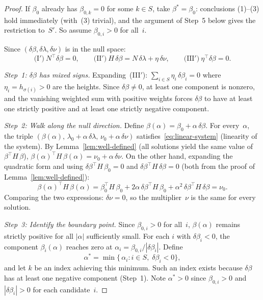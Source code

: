 \begin{proof}
If $\beta_0$ already has $\beta_{0,k} = 0$ for some $k \in S$,
take $\beta^* = \beta_0$: conclusions (1)--(3) hold immediately
(with~(3) trivial), and the argument of Step~5 below gives the
restriction to~$S'$. So assume $\beta_{0,i} > 0$ for all~$i$.

Since $(\delta\beta, \delta\lambda, \delta\nu)$ is in the null space:
\[
  \text{(I$'$)}\ N^\top \delta\beta = 0, \qquad
  \text{(II$'$)}\ H\,\delta\beta
    = N\,\delta\lambda + \eta\,\delta\nu, \qquad
  \text{(III$'$)}\ \eta^\top \delta\beta = 0.
\]

\emph{Step~1: $\delta\beta$ has mixed signs.}
Expanding~(III$'$):
$\sum_{i \in S} \eta_i\, \delta\beta_i = 0$
where $\eta_i = h_{\sigma(i)} > 0$ are the heights.
Since $\delta\beta \neq 0$, at least one component is
nonzero, and the vanishing weighted sum with positive weights
forces $\delta\beta$ to have at least one strictly positive
and at least one strictly negative component.

\emph{Step~2: Walk along the null direction.}
Define $\beta(\alpha) = \beta_0 + \alpha\,\delta\beta$.
For every~$\alpha$, the triple
$(\beta(\alpha),\, \lambda_0 + \alpha\,\delta\lambda,\,
  \nu_0 + \alpha\,\delta\nu)$
satisfies~\eqref{eq:linear-system} (linearity of the system).
By Lemma~\ref{lem:well-defined}
(all solutions yield the same value of
$\beta^\top H\, \beta$),
$\beta(\alpha)^\top H\, \beta(\alpha) = \nu_0 + \alpha\,\delta\nu$.
On the other hand, expanding the quadratic form and using
$\delta\beta^\top H\, \beta_0 = 0$ and
$\delta\beta^\top H\, \delta\beta = 0$
(both from the proof of Lemma~\ref{lem:well-defined}):
\[
  \beta(\alpha)^\top H\, \beta(\alpha)
  = \beta_0^\top H\, \beta_0
    + 2\alpha\,\delta\beta^\top H\,\beta_0
    + \alpha^2\,\delta\beta^\top H\,\delta\beta
  = \nu_0.
\]
Comparing the two expressions: $\delta\nu = 0$, so the
multiplier~$\nu$ is the same for every solution.

\emph{Step~3: Identify the boundary point.}
Since $\beta_{0,i} > 0$ for all~$i$,
$\beta(\alpha)$ remains strictly positive for all
$|\alpha|$ sufficiently small.
For each $i$ with $\delta\beta_i < 0$, the component
$\beta_i(\alpha)$ reaches zero at
$\alpha_i = \beta_{0,i} / |\delta\beta_i|$.
Define
\[
  \alpha^*
  = \min\bigl\{\,
      \alpha_i : i \in S,\; \delta\beta_i < 0
    \bigr\},
\]
and let $k$ be an index achieving this minimum.
Such an index exists because $\delta\beta$ has at least one
negative component (Step~1).
Note $\alpha^* > 0$ since $\beta_{0,i} > 0$ and
$|\delta\beta_i| > 0$ for each candidate~$i$.


\end{proof}
